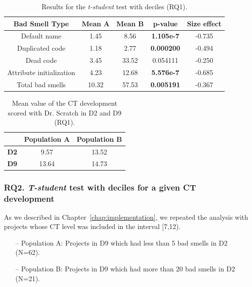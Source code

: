 \begin{table}
 \begin{center}
  \begin{tabular}{|c|c|c|c|c|}
    \hline
    \textbf{Bad Smell Type} & \textbf{Mean A} & \textbf{Mean B} & \textbf{p-value} & \textbf{Size effect} \\ \hline
    Default name & 1.45 & 8.56 & \textbf{1.105e-7} & -0.735 \\ \hline
    Duplicated code & 1.18 & 2.77 & \textbf{0.000200} & -0.494 \\ \hline
    Dead code & 3.45 & 33.52 & 0.054111 & -0.250 \\ \hline
    Attribute initialization & 4.23 & 12.68 & \textbf{5.576e-7} & -0.685 \\ \hline
    Total bad smells & 10.32 & 57.53 & \textbf{0.005191} & -0.367 \\ \hline
  \end{tabular}
  \caption{Results for the \textit{t-student} test with deciles (RQ1).}
  \label{table:rq1_statistical_results}
 \end{center}
\end{table}

\begin{table}
 \begin{center}
  \begin{tabular}{|c|c|c|}
    \hline
     & \textbf{Population A} & \textbf{Population B} \\ \hline
    \textbf{D2} & 9.57 & 13.52 \\ \hline
    \textbf{D9} & 13.64 & 14.73 \\ \hline
  \end{tabular}
  \caption{Mean value of the CT development scored with Dr. Scratch in D2 and D9 (RQ1).}
  \label{table:rq1_statistical_results_mean}
 \end{center}
\end{table}



\subsubsection{RQ2. \textit{T-student} test with deciles for a given CT development}
\label{subsubsec:rq2_statistical_results}

As we described in Chapter~\ref{chap:implementation}, we repeated the analysis with projects whose CT level was included in the interval [7,12). 

\begin{itemize}
    \item[--] Population A: Projects in D9 which had less than 5 bad smells in D2 (N=62).
    \item[--] Population B: Projects in D9 which had more than 20 bad smells in D2 (N=21).
\end{itemize}

